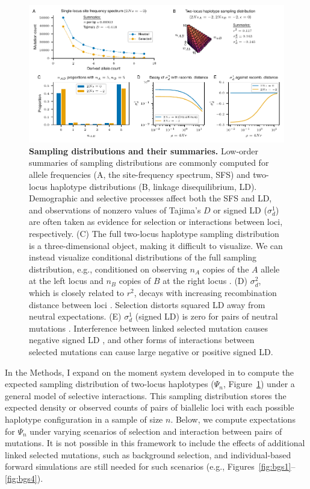\documentclass[]{article}
\begin{document}
\begin{figure}[tb!]
    \centering
    \includegraphics{../figures/two-locus-spectrum/stats_summaries}
    \caption{
        \textbf{Sampling distributions and their summaries.}
        Low-order summaries of sampling distributions are commonly computed
        for allele frequencies (A, the site-frequency spectrum, SFS)
        and two-locus haplotype distributions (B, linkage disequilibrium, LD).
        Demographic and selective processes affect both the SFS and LD,
        and observations of nonzero values of Tajima's $D$ or signed LD
        ($\sigma_d^1$) are often taken as evidence for selection or interactions
        between loci, respectively.
        (C) The full two-locus haplotype sampling distribution is a three-dimensional
        object, making it difficult to visualize. We can instead visualize conditional
        distributions of the full sampling distribution, e.g., conditioned on observing
        \(n_A\) copies of the \(A\) allele at the left locus and \(n_B\) copies of
        \(B\) at the right locus \citep[e.g.,][]{Hudson2001-sg}.
        (D) $\sigma_d^2$, which is closely related to $r^2$, decays
        with increasing recombination distance between loci \citep{Ohta1969-ie}.
        Selection distorts squared LD away from neutral expectations.
        (E) $\sigma_d^1$ (signed LD) is zero for
        pairs of neutral mutations \citep{Hill1968-vu}. Interference between linked
        selected mutation causes negative signed LD \citep{Hill1966-gv}, and other
        forms of interactions between selected mutations can cause large negative
        or positive signed LD.
    }
    \label{fig:TwoLocusFS}
\end{figure}

In the Methods, I expand on the moment system developed in
\citet{Ragsdale2019-nt} to compute the expected sampling distribution of
two-locus haplotypes (\(\Psi_n\), Figure~\ref{fig:TwoLocusFS}) under a general
model of selective interactions. This sampling distribution stores the expected
density or observed counts of pairs of biallelic loci with each possible
haplotype configuration in a sample of size \(n\). Below, we compute
expectations for \(\Psi_n\) under varying scenarios of selection and
interaction between pairs of mutations. It is not possible in this framework to
include the effects of additional linked selected mutations, such as background
selection, and individual-based forward simulations are still needed for such
scenarios (e.g., Figures~\ref{fig:bgs1}--\ref{fig:bgs4}).
\end{document}
